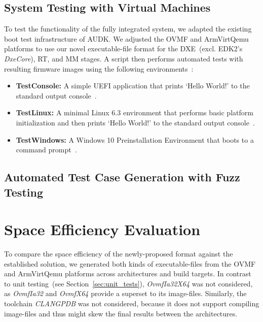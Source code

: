 \subsection{System Testing with Virtual Machines}

To test the functionality of the fully integrated system, we adapted the existing boot test infrastructure of \gls{AUDK}. We adjusted the \gls{OVMF} and \gls{ArmVirtQemu} platforms to use our novel \gls{executable-file} format for the \gls{DXE}~(excl. \gls{EDK2}'s \textit{DxeCore}), \gls{RT}, and \gls{MM} stages. A script then performs automated tests with resulting \gls{firmware} \glspl{image} using the following environments~\cite{ocbuild}:

\begin{itemize}
  \item \textbf{TestConsole:} A simple \gls{UEFI} application that prints `Hello World!' to the standard output console~\cite{ocbuild}.
  \item \textbf{TestLinux:} A minimal Linux 6.3 environment that performs basic platform initialization and then prints `Hello World!' to the standard output console~\cite{ocbuild}.
  \item \textbf{TestWindows:} A Windows 10 Preinstallation Environment that boots to a command prompt~\cite{ocbinarydata-winpe}.
\end{itemize}

\subsection{Automated Test Case Generation with Fuzz Testing}



\section{Space Efficiency Evaluation}

To compare the space efficiency of the newly-proposed format against the established  solution, we generated both kinds of \glspl{executable-file} from the \gls{OVMF} and \gls{ArmVirtQemu} platforms across architectures and build targets. In contrast to unit testing~(see Section~\ref{sec:unit_tests}), \textit{OvmfIa32X64} was not considered, as \textit{OvmfIa32} and \textit{OvmfX64} provide a superset to its \glspl{image-file}. Similarly, the toolchain \textit{CLANGPDB} was not considered, because it does not support compiling  \glspl{image-file} and thus might skew the final results between the architectures.

